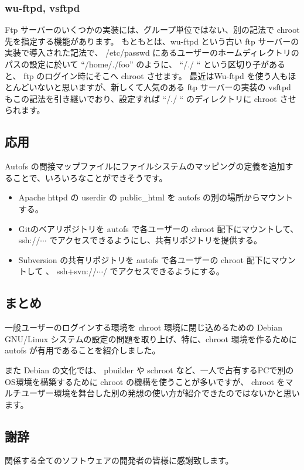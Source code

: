 \subsubsection{wu-ftpd, vsftpd}
Ftp サーバーのいくつかの実装には、グループ単位ではない、別の記法で chroot 先を指定する機能があります。
もともとは、wu-ftpd という古い ftp サーバーの実装で導入された記法で、
/etc/passwd にあるユーザーのホームディレクトリのパスの設定に於いて ``/home/./foo'' のように、 ``/./ `` という区切り子があると、 ftp のログイン時にそこへ chroot させます。
最近はWu-ftpd を使う人もほとんどいないと思いますが、新しくて人気のある ftp サーバーの実装の vsftpd もこの記法を引き継いでおり、設定すれば ``/./ ``  のディレクトリに chroot させられます。

\subsection{応用}

Autofs の間接マップファイルにファイルシステムのマッピングの定義を追加することで、いろいろなことができそうです。

\begin{itemize}
\item Apache httpd の userdir の public\_html を autofs の別の場所からマウントする。
\item Gitのベアリポジトリを autofs で各ユーザーの chroot 配下にマウントして、 ssh://$\cdots$ でアクセスできるようにし、共有リポジトリを提供する。
\item Subversion の共有リポジトリを autofs で各ユーザーの chroot 配下にマウントして 、 ssh+svn://$\cdots$/ でアクセスできるようにする。
\end{itemize}


\subsection{まとめ}

一般ユーザーのログインする環境を chroot 環境に閉じ込めるための Debian GNU/Linux システムの設定の問題を取り上げ、特に、chroot 環境を作るために autofs が有用であることを紹介しました。

また Debian の文化では、 pbuilder や schroot など、一人で占有するPCで別のOS環境を構築するために chroot の機構を使うことが多いですが、 chroot をマルチユーザー環境を舞台した別の発想の使い方が紹介できたのではないかと思います。

\subsection*{謝辞}
関係する全てのソフトウェアの開発者の皆様に感謝致します。

